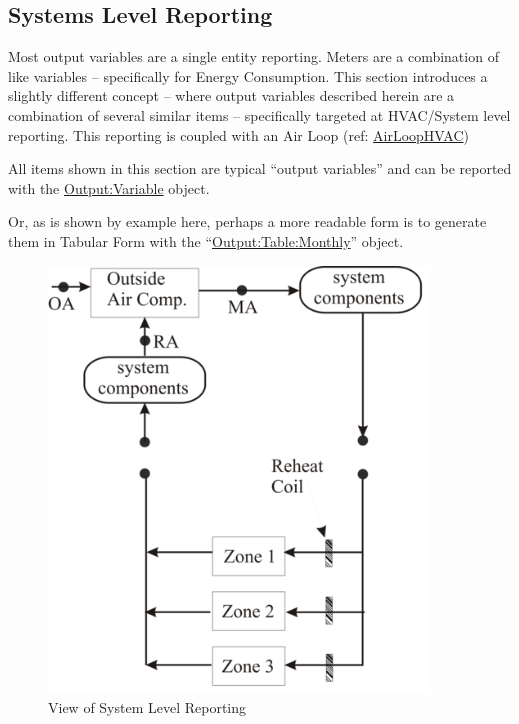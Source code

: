 \subsection{Systems Level Reporting}\label{systems-level-reporting}

Most output variables are a single entity reporting. Meters are a combination of like variables -- specifically for Energy Consumption. This section introduces a slightly different concept -- where output variables described herein are a combination of several similar items -- specifically targeted at HVAC/System level reporting. This reporting is coupled with an Air Loop (ref: \hyperref[airloophvac]{AirLoopHVAC})

All items shown in this section are typical ``output variables'' and can be reported with the \hyperref[outputvariable]{Output:Variable} object.

Or, as is shown by example here, perhaps a more readable form is to generate them in Tabular Form with the ``\hyperref[outputtablemonthly]{Output:Table:Monthly}'' object.

\begin{figure}[hbtp] %
\centering
\includegraphics[width=0.9\textwidth, height=0.9\textheight, keepaspectratio=true]{media/image213.png}
\caption{View of System Level Reporting \protect \label{fig:view-of-system-level-reporting}}
\end{figure}

